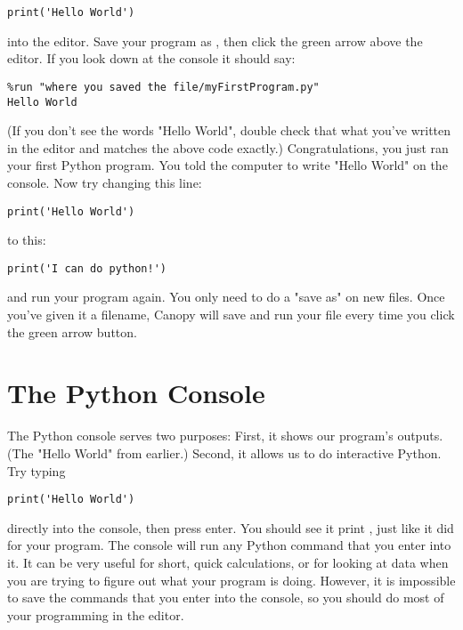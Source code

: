 \begin{Verbatim}
print('Hello World')
\end{Verbatim}

into the editor. Save your program as , then click the green
arrow above the editor. If you look down at the console it should say:

\begin{Verbatim}
%run "where you saved the file/myFirstProgram.py"
Hello World
\end{Verbatim}
(If you don't see the words "Hello World", double check that what you've written in the editor and matches the above code exactly.) Congratulations, you just ran your first Python program. You told the computer to write "Hello World" on the console.
Now try changing this line:
\begin{Verbatim}
print('Hello World')
\end{Verbatim}
to this:
\begin{Verbatim}
print('I can do python!')
\end{Verbatim}
and run your program again. You only need to do a "save as" on new files. Once you've given it a filename, Canopy will save and run your file every time you click the green arrow button.
\section{The Python Console}
The Python console serves two purposes: First, it shows our program's outputs. (The "Hello World" from earlier.) Second, it allows us to do interactive Python. Try typing
\begin{Verbatim}
print('Hello World')
\end{Verbatim}
directly into the console, then press enter.  You should see it print
, just like it did for your program. The console
will run any Python command that you enter into it. It can be very
useful for short, quick calculations, or for looking at data when you
are trying to figure out what your program is doing. However, it is
impossible to save the commands that you enter into the console, so
you should do most of your programming in the editor.


